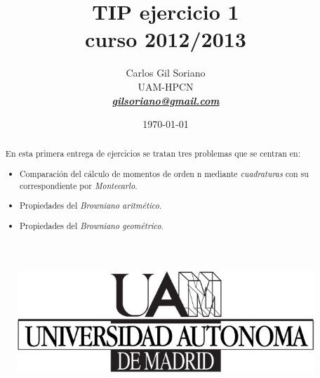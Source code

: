\documentclass[a4paper,11pt]{article}
\begin{document}

\title{\textbf{{\LARGE TIP ejercicio 1 \\ curso 2012/2013}}}
\author{Carlos Gil Soriano\\UAM-HPCN\\
\href{mailto:gilsoriano@gmail.com}{\textbf{\textit{gilsoriano@gmail.com}}}}
\date{\today}
\maketitle
\thispagestyle{empty}
\begin{figure}[htb]
   \begin{center}
      \includegraphics[scale=1,
      keepaspectratio]{../../../../../figures/logo/logo-uam.jpg}
   \end{center}
\end{figure}

\begin{abstract}

   En esta primera entrega de ejercicios se tratan tres problemas que se centran
   en:
   \begin{itemize}
      \item Comparaci\'on del c\'alculo de  momentos de orden n mediante
         \textit{cuadraturas} con su correspondiente por \textit{Montecarlo}.
      \item Propiedades del \textit{Browniano aritm\'etico}.
      \item Propiedades del \textit{Browniano geom\'etrico}.
   \end{itemize}

\end{abstract}
\end{document}
